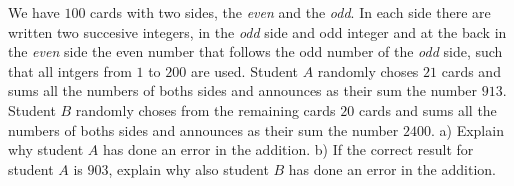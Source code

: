 We have $100$ cards with two sides, the \textit{even} and the \textit{odd}. In each side there are written two succesive integers, in the \textit{odd} side and odd integer and at the back in the \textit{even} side the even number that follows the odd number of the \textit{odd} side, such that all intgers from $1$ to $200$ are used.
Student $A$ randomly choses $21$ cards and sums all the numbers of boths sides and announces as their sum the number $913$.
Student $B$ randomly choses from the remaining cards $20$ cards and sums all the numbers of boths sides and announces as their sum the number $2400$.
a) Explain why student $A$ has done an error in the addition.
b) If the correct result for student $A$ is $903$, explain why also student $B$ has done an error in the addition.
